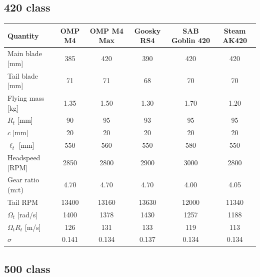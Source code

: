 \documentclass[11pt,a4paper]{article}
\newcommand{\OmegaT}{\Omega_t}
\newcommand{\Rt}{R_t}
\begin{document}
\subsection{420 class}\label{app:cls420}

\begin{center}
\renewcommand{\arraystretch}{1.2}
\small
\begin{tabular}{lccccc}
\toprule
Quantity & OMP M4 & OMP M4 Max & Goosky RS4 & SAB Goblin 420 & Steam AK420 \\
\midrule
Main blade [mm]       & 385   & 420   & 390   & 420   & 420   \\
Tail blade [mm]       & 71    & 71    & 68    & 70    & 70    \\
Flying mass [kg]      & 1.35  & 1.50  & 1.30  & 1.70  & 1.20  \\
\(\Rt\) [mm]          & 90    & 95    & 93    & 95    & 95    \\
\(c\) [mm]            & 20    & 20    & 20    & 20    & 20    \\
\(\ell_t\) [mm]       & 550   & 560   & 550   & 580   & 550   \\
Headspeed [RPM]       & 2850  & 2800  & 2900  & 3000  & 2800  \\
Gear ratio (m:t)      & 4.70  & 4.70  & 4.70  & 4.00  & 4.05  \\
Tail RPM              & 13400 & 13160 & 13630 & 12000 & 11340 \\
\(\OmegaT\) [rad/s]   & 1400  & 1378  & 1430  & 1257  & 1188  \\
\(\OmegaT\Rt\) [m/s]  & 126   & 131   & 133   & 119   & 113   \\
\(\sigma\)            & 0.141 & 0.134 & 0.137 & 0.134 & 0.134 \\
\bottomrule
\end{tabular}
\end{center}

\subsection{500 class}\label{app:cls500}
\end{document}
